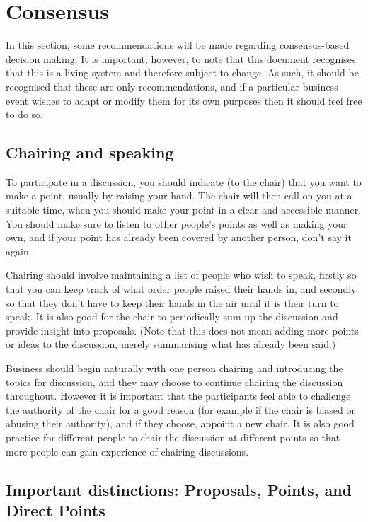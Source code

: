 \documentclass[a4paper, 12pt]{article} %
\begin{document}
\section{Consensus}
\label{sec:consensus}
In this section, some recommendations will be made regarding consensus-based decision making.  It is important, however, to note that this document recognises that this is a living system and therefore subject to change.  As such, it should be recognised that these are only recommendations, and if a particular business event wishes to adapt or modify them for its own purposes then it should feel free to do so.

\subsection{Chairing and speaking}
To participate in a discussion, you should indicate (to the chair) that you want to make a point, usually by raising your hand.  The chair will then call on you at a suitable time, when you should make your point in a clear and accessible manner.  You should make sure to listen to other people's points as well as making your own, and if your point has already been covered by another person, don't say it again.

Chairing should involve maintaining a list of people who wish to speak, firstly so that you can keep track of what order people raised their hands in, and secondly so that they don't have to keep their hands in the air until it is their turn to speak.  It is also good for the chair to periodically sum up the discussion and provide insight into proposals.  (Note that this does not mean adding more points or ideas to the discussion, merely summarising what has already been said.)

Business should begin naturally with one person chairing and introducing the topics for discussion, and they may choose to continue chairing the discussion throughout.  However it is important that the participants feel able to challenge the authority of the chair for a good reason (for example if the chair is biased or abusing their authority), and if they choose, appoint a new chair.  It is also good practice for different people to chair the discussion at different points so that more people can gain experience of chairing discussions.

\subsection{Important distinctions: Proposals, Points, and Direct Points}
\end{document}
